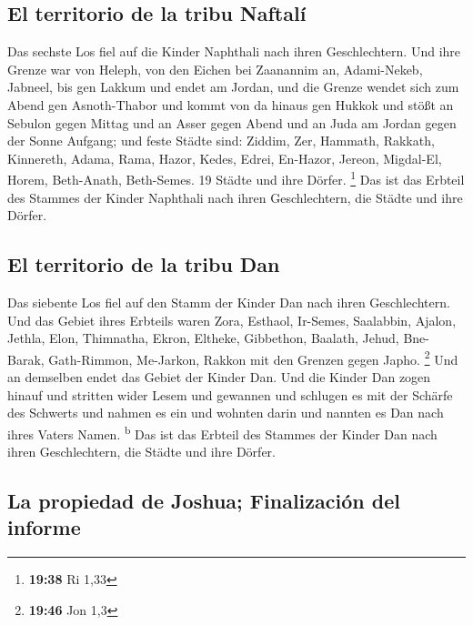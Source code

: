 \hypertarget{el-territorio-de-la-tribu-naftaluxed}{%
\subsection{El territorio de la tribu
Naftalí}\label{el-territorio-de-la-tribu-naftaluxed}}

 Das sechste Los fiel auf die Kinder Naphthali nach ihren
Geschlechtern.  Und ihre Grenze war von Heleph, von den
Eichen bei Zaanannim an, Adami-Nekeb, Jabneel, bis gen Lakkum und endet
am Jordan,  und die Grenze wendet sich zum Abend gen
Asnoth-Thabor und kommt von da hinaus gen Hukkok und stößt an Sebulon
gegen Mittag und an Asser gegen Abend und an Juda am Jordan gegen der
Sonne Aufgang;  und feste Städte sind: Ziddim, Zer,
Hammath, Rakkath, Kinnereth,  Adama, Rama, Hazor,
 Kedes, Edrei, En-Hazor,  Jereon,
Migdal-El, Horem, Beth-Anath, Beth-Semes. 19 Städte und ihre Dörfer.
\footnote{\textbf{19:38} Ri 1,33}  Das ist das Erbteil
des Stammes der Kinder Naphthali nach ihren Geschlechtern, die Städte
und ihre Dörfer.

\hypertarget{el-territorio-de-la-tribu-dan}{%
\subsection{El territorio de la tribu
Dan}\label{el-territorio-de-la-tribu-dan}}

 Das siebente Los fiel auf den Stamm der Kinder Dan nach
ihren Geschlechtern.  Und das Gebiet ihres Erbteils waren
Zora, Esthaol, Ir-Semes,  Saalabbin, Ajalon, Jethla,
 Elon, Thimnatha, Ekron,  Eltheke,
Gibbethon, Baalath,  Jehud, Bne-Barak, Gath-Rimmon,
 Me-Jarkon, Rakkon mit den Grenzen gegen Japho.
\footnote{\textbf{19:46} Jon 1,3}  Und an demselben endet
das Gebiet der Kinder Dan. Und die Kinder Dan zogen hinauf und stritten
wider Lesem und gewannen und schlugen es mit der Schärfe des Schwerts
und nahmen es ein und wohnten darin und nannten es Dan nach ihres Vaters
Namen. \textsuperscript{b}  Das ist das Erbteil des
Stammes der Kinder Dan nach ihren Geschlechtern, die Städte und ihre
Dörfer.

\hypertarget{la-propiedad-de-joshua-finalizaciuxf3n-del-informe}{%
\subsection{La propiedad de Joshua; Finalización del
informe}\label{la-propiedad-de-joshua-finalizaciuxf3n-del-informe}}

